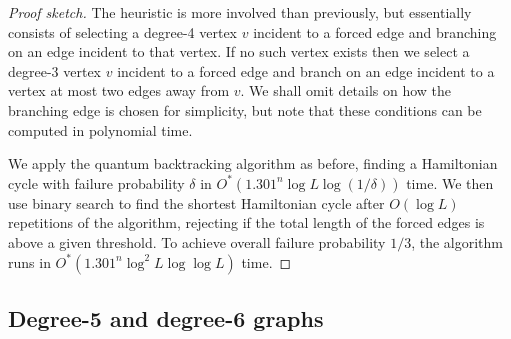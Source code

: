 \begin{proof}[Proof sketch]
The heuristic is more involved than previously, but essentially consists of selecting a degree-4 vertex $v$ incident to a forced edge and branching on an edge incident to that vertex. If no such vertex exists then we select a degree-3 vertex $v$ incident to a forced edge and branch on an edge incident to a vertex at most two edges away from $v$. We shall omit details on how the branching edge is chosen for simplicity, but note that these conditions can be computed in polynomial time.

We apply the quantum backtracking algorithm as before, finding a Hamiltonian cycle with failure probability $\delta$ in $O^*(1.301^n\log L\log(1/\delta))$ time. We then use binary search to find the shortest Hamiltonian cycle after $O(\log L)$ repetitions of the algorithm, rejecting if the total length of the forced edges is above a given threshold. To achieve overall failure probability $1/3$, the algorithm runs in $O^*(1.301^n\log^2 L\log \log L)$ time.
\end{proof}

\subsection{Degree-5 and degree-6 graphs}

